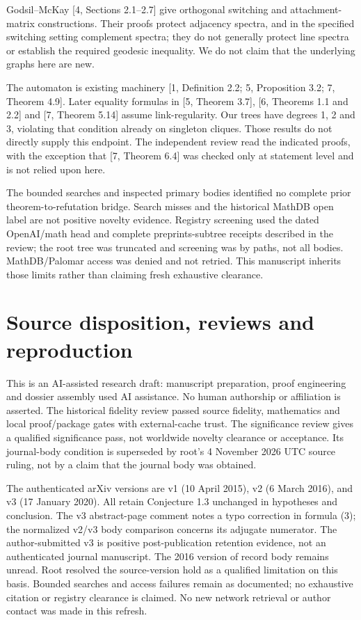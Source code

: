 \documentclass[11pt]{article}
\begin{document}
Godsil--McKay [4, Sections 2.1--2.7] give orthogonal switching and attachment-matrix constructions. Their proofs protect adjacency spectra, and in the specified switching setting complement spectra; they do not generally protect line spectra or establish the required geodesic inequality. We do not claim that the underlying graphs here are new.

The automaton is existing machinery [1, Definition 2.2; 5, Proposition 3.2; 7, Theorem 4.9]. Later equality formulas in [5, Theorem 3.7], [6, Theorems 1.1 and 2.2] and [7, Theorem 5.14] assume link-regularity. Our trees have degrees 1, 2 and 3, violating that condition already on singleton cliques. Those results do not directly supply this endpoint. The independent review read the indicated proofs, with the exception that [7, Theorem 6.4] was checked only at statement level and is not relied upon here.

The bounded searches and inspected primary bodies identified no complete prior theorem-to-refutation bridge. Search misses and the historical MathDB open label are not positive novelty evidence. Registry screening used the dated OpenAI/math head and complete preprints-subtree receipts described in the review; the root tree was truncated and screening was by paths, not all bodies. MathDB/Palomar access was denied and not retried. This manuscript inherits those limits rather than claiming fresh exhaustive clearance.
\newpage
\section{Source disposition, reviews and reproduction}
This is an AI-assisted research draft: manuscript preparation, proof engineering and dossier assembly used AI assistance. No human authorship or affiliation is asserted. The historical fidelity review passed source fidelity, mathematics and local proof/package gates with external-cache trust. The significance review gives a qualified significance pass, not worldwide novelty clearance or acceptance. Its journal-body condition is superseded by root's 4 November 2026 UTC source ruling, not by a claim that the journal body was obtained.

The authenticated arXiv versions are v1 (10 April 2015), v2 (6 March 2016), and v3 (17 January 2020). All retain Conjecture 1.3 unchanged in hypotheses and conclusion. The v3 abstract-page comment notes a typo correction in formula (3); the normalized v2/v3 body comparison concerns its adjugate numerator. The author-submitted v3 is positive post-publication retention evidence, not an authenticated journal manuscript. The 2016 version of record body remains unread. Root resolved the source-version hold as a qualified limitation on this basis. Bounded searches and access failures remain as documented; no exhaustive citation or registry clearance is claimed. No new network retrieval or author contact was made in this refresh.
\end{document}

